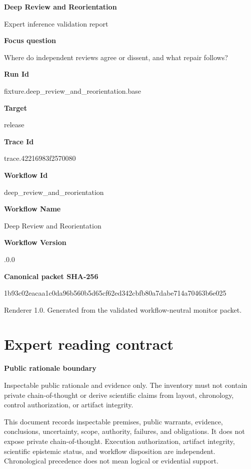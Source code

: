\documentclass[10pt,a4paper]{article}
\newcommand{\TraceField}[2]{\par\noindent\textbf{#1}\par\noindent #2\par\smallskip}
\begin{document}
\hypersetup{pageanchor=false}
\begin{titlepage}
\centering
{\LARGE\bfseries Deep Review and Reorientat\allowbreak{}ion\par}
\vspace{1em}
{\large Expert inference validation report\par}
\vspace{2em}
\begin{minipage}{0.92\linewidth}
\TraceField{Focus question}{Where do independen\allowbreak{}t reviews agree or dissent, and what repair follows?}

\TraceField{Run Id}{fixture.\allowbreak{}deep\_\allowbreak{}review\_\allowbreak{}and\_\allowbreak{}reorientat\allowbreak{}ion.\allowbreak{}base}

\TraceField{Target}{release}

\TraceField{Trace Id}{trace.\allowbreak{}42216983f2\allowbreak{}570080}

\TraceField{Workflow Id}{deep\_\allowbreak{}review\_\allowbreak{}and\_\allowbreak{}reorientat\allowbreak{}ion}

\TraceField{Workflow Name}{Deep Review and Reorientat\allowbreak{}ion}

\TraceField{Workflow Version}{1.\allowbreak{}0.\allowbreak{}0}

\TraceField{Canonical packet SHA-256}{1b93c02eac\allowbreak{}aa1c0da96b\allowbreak{}560b5d65cf\allowbreak{}62ed342cbf\allowbreak{}b80a7dabe7\allowbreak{}14a70463b6\allowbreak{}e025}

\end{minipage}
\vfill
{\small Renderer 1.0. Generated from the validated workflow-neutral monitor packet.}
\end{titlepage}
\tableofcontents\clearpage
\hypersetup{pageanchor=true}
\section{Expert reading contract}\label{sec-reading-contract}
\TraceField{Public rationale boundary}{Inspectabl\allowbreak{}e public rationale and evidence only.\allowbreak{} The inventory must not contain private chain-\allowbreak{}of-\allowbreak{}thought or derive scientific\allowbreak{} claims from layout, chronology\allowbreak{}, control authorizat\allowbreak{}ion, or artifact integrity.\allowbreak{}}

This document records inspectable premises, public warrants, evidence, conclusions,
uncertainty, scope, authority, failures, and obligations. It does not expose private
chain-of-thought. Execution authorization, artifact integrity, scientific epistemic
status, and workflow disposition are independent. Chronological precedence does not
mean logical or evidential support.
\end{document}
